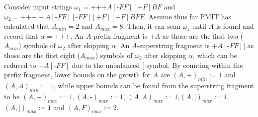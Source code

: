 \documentclass{llncs}
\begin{document}
	\begin{example}
		Consider input strings $\omega_{1} = \text{+}\text{+}\text{+}A[\text{-}FF][\text{+}F]BF$ and $\omega_{2} = \text{+}\text{+}\text{+}+A[\text{-}FF][\text{-}FF][\text{+}F][\text{+}F]BFF$. Assume thus far PMIT has calculated that $A_{min} = 2$ and $A_{max} = 8$. Then, it can scan $\omega_{1}$ until $A$ is found and record that $\alpha = \text{+++}$. An $A$-prefix fragment is $+A$ as those are the first two ($A_{min}$) symbols of $\omega_{2}$ after skipping $\alpha$. An $A$-superstring fragment is $\text{+}A[\text{-}FF][$ as those are the first eight ($A_{max}$) symbols of $\omega_{2}$ after skipping $\alpha$, which can be reduced to $\text{+}A[\text{-}FF]$ due to the unbalanced $[$ symbol. By counting within the prefix fragment, lower bounds on the growth for $A$ are $(A,\text{+})_{min} := 1$ and $(A,A)_{min} := 1$, while upper bounds can be found from the superstring fragment to be $(A,\text{+})_{max} := 1, (A,\text{-})_{max} := 1$, $(A,A)_{max} := 1$,$(A,[)_{max} := 1$, $(A,])_{max} := 1$ and $(A,F)_{max} := 2$.
		\label{example:1}
	\end{example}	
	
	
\end{document}
